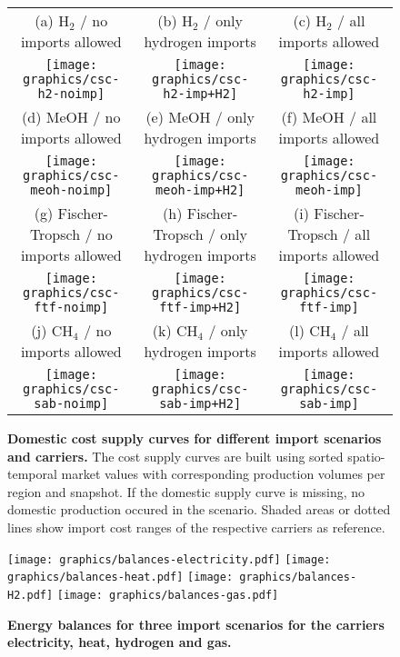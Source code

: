 \documentclass[5p,10pt]{elsarticle}
\begin{document}
\begin{figure*}
    \footnotesize
    \begin{tabular}{ccc}
        (a) H$_2$ / no imports allowed & (b) H$_2$ / only hydrogen imports & (c) H$_2$ / all imports allowed \\
        \texttt{[image: graphics/csc-h2-noimp]} &
        \texttt{[image: graphics/csc-h2-imp+H2]} &
        \texttt{[image: graphics/csc-h2-imp]} \\
        (d) MeOH / no imports allowed & (e) MeOH / only hydrogen imports & (f) MeOH / all imports allowed \\
        \texttt{[image: graphics/csc-meoh-noimp]} &
        \texttt{[image: graphics/csc-meoh-imp+H2]} &
        \texttt{[image: graphics/csc-meoh-imp]} \\
        (g) Fischer-Tropsch / no imports allowed & (h) Fischer-Tropsch / only hydrogen imports & (i) Fischer-Tropsch / all imports allowed \\
        \texttt{[image: graphics/csc-ftf-noimp]} &
        \texttt{[image: graphics/csc-ftf-imp+H2]} &
        \texttt{[image: graphics/csc-ftf-imp]} \\
        (j) CH$_4$ / no imports allowed & (k) CH$_4$ / only hydrogen imports & (l) CH$_4$ / all imports allowed \\
        \texttt{[image: graphics/csc-sab-noimp]} &
        \texttt{[image: graphics/csc-sab-imp+H2]} &
        \texttt{[image: graphics/csc-sab-imp]} \\
    \end{tabular}
    \caption{\textbf{Domestic cost supply curves for different import scenarios and carriers.}
        The cost supply curves are built using sorted spatio-temporal market
        values with corresponding production volumes per region and snapshot. If
        the domestic supply curve is missing, no domestic production occured in
        the scenario. Shaded areas or dotted lines show import cost ranges of
        the respective carriers as reference.}
    \label{fig:si:cost-supply-curves}
\end{figure*}


\begin{figure*}
    \texttt{[image: graphics/balances-electricity.pdf]}
    \texttt{[image: graphics/balances-heat.pdf]}
    \texttt{[image: graphics/balances-H2.pdf]}
    \texttt{[image: graphics/balances-gas.pdf]}
    \caption{\textbf{Energy balances for three import scenarios for the carriers electricity, heat, hydrogen and gas.}
    }
    \label{fig:si:balances-a}
\end{figure*}
\end{document}
